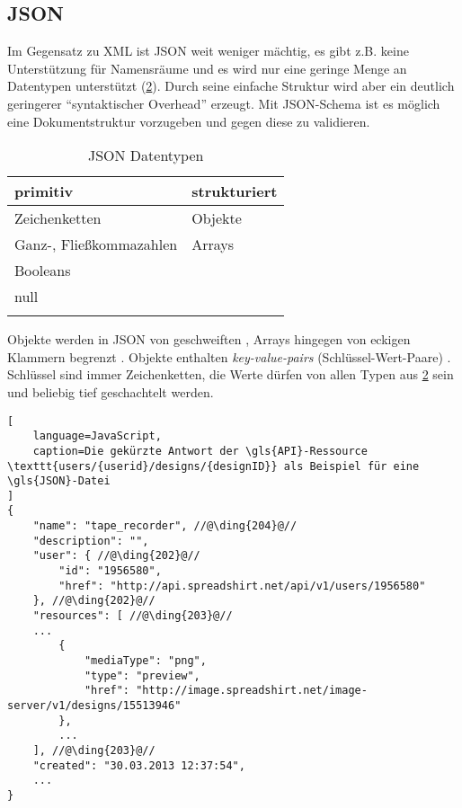 \subsection{JSON}
\label{sec:json}


Im Gegensatz zu \gls{XML} ist \gls{JSON} weit weniger mächtig, es gibt z.B. keine Unterstützung für Namensräume und es wird nur eine geringe Menge an Datentypen unterstützt (\cref{tab:jsonDatatypes}). 
Durch seine einfache Struktur wird aber ein deutlich geringerer \enquote{syntaktischer Overhead} erzeugt.
Mit \gls{JSON}-Schema \cite{json-schema-draft} ist es möglich eine Dokumentstruktur vorzugeben und gegen diese zu validieren. 

\begin{table}[tb]
    \begin{longtable}[c]{l l}
        \toprule
        \rowcolor{lightgray}
        \textbf{primitiv}   & \textbf{strukturiert}\\
        \midrule
        Zeichenketten       & Objekte\\
        Ganz-, 
        Fließkommazahlen    & Arrays\\
        Booleans            & \\
        null                & \\
        \bottomrule
        \caption{\gls{JSON} Datentypen}
        \label{tab:jsonDatatypes}
    \end{longtable}
\end{table}

Objekte werden in \gls{JSON} von geschweiften , Arrays hingegen von eckigen Klammern begrenzt . 
Objekte enthalten \emph{key-value-pairs} (Schlüssel-Wert-Paare) . Schlüssel sind immer Zeichenketten, die Werte dürfen von allen Typen aus \cref{tab:jsonDatatypes} sein und beliebig tief geschachtelt werden.

%
%
\begin{minipage}{\textwidth}
\begin{lstlisting}[
    language=JavaScript,
    caption=Die gekürzte Antwort der \gls{API}-Ressource \texttt{users/{userid}/designs/{designID}} als Beispiel für eine \gls{JSON}-Datei
]
{
    "name": "tape_recorder", //@\ding{204}@//
    "description": "",
    "user": { //@\ding{202}@//
        "id": "1956580",
        "href": "http://api.spreadshirt.net/api/v1/users/1956580"
    }, //@\ding{202}@//
    "resources": [ //@\ding{203}@//
    ...
        {
            "mediaType": "png",
            "type": "preview",
            "href": "http://image.spreadshirt.net/image-server/v1/designs/15513946"
        }, 
        ...
    ], //@\ding{203}@//
    "created": "30.03.2013 12:37:54",
    ...
}
\end{lstlisting}    
\end{minipage}
